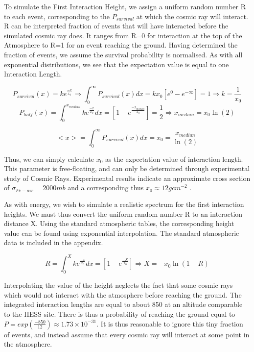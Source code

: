 \documentclass[11pt]{article}
\begin{document}
To simulate the First Interaction Height, we assign a uniform random number R to each event, corresponding to the $P_{survival}$ at which the cosmic ray will interact. R can be interpreted fraction of events that will have interacted before the simulated cosmic ray does. It ranges from R=0 for interaction at the top of the Atmosphere to R=1 for an event reaching the ground. Having determined the fraction of events, we assume the survival probability is normalised. As with all exponential distributions, we see that the expectation value is equal to one Interaction Length.

\[ P_{survival}(x) = k e^{\frac{-x}{x_{0}}} \Longrightarrow \int_{0}^{\infty} P_{survival}(x) dx = k x_{0} [ e^{0} - e ^ {- \infty}] = 1 \Longrightarrow k = \frac{1}{x_{0}}\]
\[P_{half}(x) =\int_{0}^{x_{median}} k e^{\frac{-x}{x_{0}}} dx =[1 -e^{\frac{-x_{median}}{x_{0}}} ]= \frac{1}{2} \Longrightarrow {x_{median}} = x_{0} \ln (2)\]

\[ <x> =  \int_{0}^{\infty} P_{survival}(x) dx = x_{0} = \frac{x_{median}}{\ln (2)} \]

Thus, we can simply calculate $x_{0}$ as the expectation value of interaction length. This parameter is free-floating, and can only be determined through experimental study of Cosmic Rays. Experimental results indicate an approximate cross section of $\sigma_{Fe-air} = 2000mb$ and a corresponding thus $x_{0} \approx 12 g cm^{-2}$ \cite{Montanus2013}. 

As with energy, we wish to simulate a realistic spectrum for the first interaction heights. We must thus convert the uniform random number R to an interaction distance X. Using the standard atmospheric tables, the corresponding height value can be found using exponential interpolation. The standard atmospheric data is included in the appendix.

\[ R = \int_{0}^{X} k e^{\frac{-x}{x_{0}}} dx = [1 -e^{\frac{-X}{x_{0}}}] \Longrightarrow X = -x_{0} \ln (1 - R) \] 

Interpolating the value of the height neglects the fact that some cosmic rays which would not interact with the atmosphere before reaching the ground. The integrated interaction lengths are equal to about 850 at an altitude comparable to the HESS site. There is thus a probability of reaching the ground equal to $P = exp(\frac{-850}{12}) \approx 1.73 \times 10 ^{-31}$. It is thus reasonable to ignore this tiny fraction of events, and instead assume that every cosmic ray will interact at some point in the atmosphere.
\end{document}

